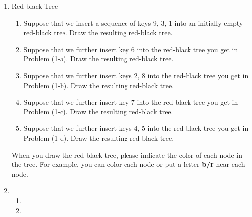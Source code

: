 \documentclass[12pt,a4paper]{article}
\makeatletter
\newtheorem*{solution}{Solution}
\theoremstyle{definition}
\renewenvironment{solution}[1][Solution] {\par\pushQED{\qed}\normalfont\topsep6\p@\@plus6\p@\relax\trivlist\item[\hskip\labelsep\bfseries#1\@addpunct{.}]\ignorespaces}{\popQED\endtrivlist\@endpefalse} \makeatother
\makeatother
\begin{document}
\begin{enumerate}

\item	Red-black Tree
	\begin{enumerate}
		\item Suppose that we insert a sequence of keys 9, 3, 1 into an initially empty red-black tree. Draw the resulting red-black tree.
		
		\item Suppose that we further insert key 6 into the red-black tree you get in Problem (1-a). Draw the resulting red-black tree.
		
		\item Suppose that we further insert keys 2, 8 into the red-black tree you get in Problem (1-b). Draw the resulting red-black tree.
		
		\item Suppose that we further insert key 7 into the red-black tree you get in Problem (1-c). Draw the resulting red-black tree.
		
		\item Suppose that we further insert keys 4, 5 into the red-black tree you get in Problem (1-d). Draw the resulting red-black tree.
		
	\end{enumerate}
	
	When you draw the red-black tree, please indicate the color of each node in the tree.
For example, you can color each node or put a letter \textbf{b/r} near each node.

\begin{solution} 
\begin{enumerate}
    \item




\item





\end{enumerate}
\end{solution}
\end{enumerate}
\end{document}
